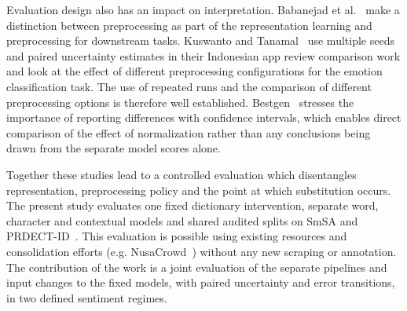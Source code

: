 Evaluation design also has an impact on interpretation. Babanejad et al.~\cite{babanejad2020} make a distinction between preprocessing as part of the representation learning and preprocessing for downstream tasks. Kuswanto and Tanamal~\cite{kuswanto2026} use multiple seeds and paired uncertainty estimates in their Indonesian app review comparison work and look at the effect of different preprocessing configurations for the emotion classification task. The use of repeated runs and the comparison of different preprocessing options is therefore well established. Bestgen~\cite{bestgen2022} stresses the importance of reporting differences with confidence intervals, which enables direct comparison of the effect of normalization rather than any conclusions being drawn from the separate model scores alone.

Together these studies lead to a controlled evaluation which disentangles representation, preprocessing policy and the point at which substitution occurs. The present study evaluates one fixed dictionary intervention, separate word, character and contextual models and shared audited splits on SmSA and PRDECT-ID~\cite{sutoyo2022}. This evaluation is possible using existing resources and consolidation efforts (e.g. NusaCrowd~\cite{cahyawijaya2023}) without any new scraping or annotation. The contribution of the work is a joint evaluation of the separate pipelines and input changes to the fixed models, with paired uncertainty and error transitions, in two defined sentiment regimes.

